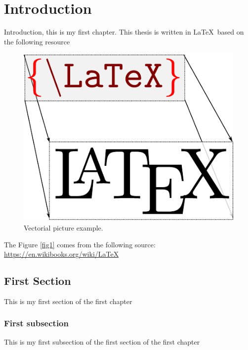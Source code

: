 \chapter{Introduction} 
\label{Chap1}

Introduction, this is my first chapter. This thesis is written in \LaTeX\ based on the following resource \citep{Lamport1985}

\begin{figure}[htbp]
\centering
\includegraphics[scale=1]{Chapters/Chapter1/LaTeX_cover}
\caption{Vectorial picture example.}
\label{fig1}
\end{figure}

The Figure \eqref{fig1} comes from the following source: \url{https://en.wikibooks.org/wiki/LaTeX}

\section{First Section}

This is my first section of the first chapter
\blindtext[2]

\subsection{First subsection}

This is my first subsection of the first section of the first chapter
\blindtext[2]